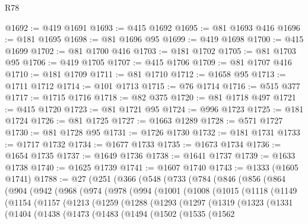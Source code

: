 \begin{lexlean}{R78}
\begin{coremodule}
@1692 := @419 @1691
@1693 := @415 @1692
@1695 := @81 @1693 @416
@1696 := @181 @1695
@1698 := @81 @1696 @95
@1699 := @419 @1698
@1700 := @415 @1699
@1702 := @81 @1700 @416
@1703 := @181 @1702
@1705 := @81 @1703 @95
@1706 := @419 @1705
@1707 := @415 @1706
@1709 := @81 @1707 @416
@1710 := @181 @1709
@1711 := @81 @1710
@1712 := @1658 @95
@1713 := @1711 @1712
@1714 := @101 @1713
@1715 := @76 @1714
@1716 := @515 @377
@1717 := @1715 @1716
@1718 := @82 @375
@1720 := @81 @1718 @497
@1721 := @415 @1720
@1723 := @81 @1721 @95
@1724 := @996 @1723
@1725 := @181 @1724
@1726 := @81 @1725
@1727 := @1663 @1289
@1728 := @571 @1727
@1730 := @81 @1728 @95
@1731 := @1726 @1730
@1732 := @181 @1731
@1733 := @1717 @1732
@1734 := @1677 @1733
@1735 := @1673 @1734
@1736 := @1654 @1735
@1737 := @1649 @1736
@1738 := @1641 @1737
@1739 := @1633 @1738
@1740 := @1625 @1739
@1741 := @1607 @1740
@1743 := @1333 (@1605 @1741)
@1788 := @27
    (@251
      (@366
        (@548
          (@733
            (@784
              (@846
                (@856
                  (@864
                    (@904
                      (@942
                        (@968
                          (@974
                            (@978
                              (@994
                                (@1001
                                  (@1008
                                    (@1015
                                      (@1118
                                        (@1149
                                          (@1154
                                            (@1157
                                              (@1213
                                                (@1259
                                                  (@1288
                                                    (@1293
                                                      (@1297
                                                        (@1319
                                                          (@1323
                                                            (@1331
                                                              (@1404
                                                                (@1438
                                                                  (@1473
                                                                    (@1483
                                                                      (@1494
                                                                        (@1502
                                                                          (@1535
                                                                            (@1562

\end{coremodule}
\end{lexlean}
